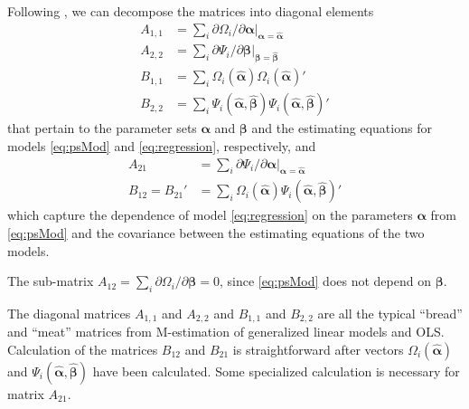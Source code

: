 \documentclass[]{article}
\begin{document}
Following \citet[][p. 373]{carroll2006measurement}, we %
can decompose the matrices into diagonal elements
\begin{equation*}
    \begin{split}
        A_{1,1}&=\sum_i \partial \Omega_i/\partial \bm{\alpha}|_{\bm{\alpha}=\bm{\hat{\alpha}}}\\
        A_{2,2}&=\sum_i\partial\Psi_i/\partial \bm{\beta}|_{\bm{\beta}=\bm{\hat{\beta}}}\\
        B_{1,1}&=\sum_i\Omega_i(\bm{\hat\alpha})\Omega_i(\bm{\hat\alpha})'\\
        B_{2,2}&=\sum_i \Psi_i(\bm{\hat\alpha},\bm{\hat\beta})\Psi_i(\bm{\hat\alpha},\bm{\hat\beta})'
    \end{split}
\end{equation*}
 that pertain to the parameter sets $\bm{\alpha}$ and $\bm{\beta}$ and the estimating equations for models \eqref{eq:psMod} and  \eqref{eq:regression}, respectively, and
 \begin{equation*}
     \begin{split}
         A_{21}&=\sum_i\partial\Psi_i/\partial \bm{\alpha}|_{\bm{\alpha}=\bm{\hat{\alpha}}}\\
         B_{12}=B_{21}'&=\sum_i \Omega_i(\bm{\hat{\alpha}})\Psi_i(\bm{\hat{\alpha}},\bm{\hat{\beta}})'
     \end{split}
 \end{equation*}
 which capture the dependence of model \eqref{eq:regression} on the parameters $\bm{\alpha}$ from \eqref{eq:psMod} and the covariance between the estimating equations of the two models.

 The sub-matrix $A_{12}=\sum_i \partial \Omega_i/\partial \bm{\beta}=0$, since \eqref{eq:psMod} does not depend on $\bm{\beta}$.

The diagonal matrices $A_{1,1}$ and $A_{2,2}$ and $B_{1,1}$ and $B_{2,2}$ are all the typical ``bread'' and ``meat'' matrices from M-estimation of generalized linear models and OLS.
Calculation of the matrices $B_{12}$ and $B_{21}$ is straightforward after vectors $\Omega_i(\bm{\hat{\alpha}})$ and $\Psi_i(\bm{\hat{\alpha}},\bm{\hat{\beta}})$ have been calculated.
Some specialized calculation is necessary for matrix $A_{21}$.
\end{document}
